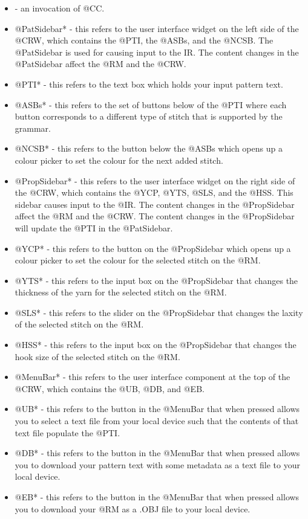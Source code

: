 \documentclass[main.tex]{subfiles}
\begin{document}
\begin{itemize}
\item {} - an invocation of @CC.
\item @PatSidebar* - this refers to the user interface widget on the left side of the @CRW, which contains the @PTI, the @ASBs, and the @NCSB. The @PatSidebar is used for causing input to the IR. The content changes in the @PatSidebar affect the @RM and the @CRW.
\item @PTI* - this refers to the text box which holds your input pattern text.
\item @ASBs* - this refers to the set of buttons below of the @PTI where each button corresponds to a different type of stitch that is supported by the grammar.
\item @NCSB* - this refers to the button below the @ASBs which opens up a colour picker to set the colour for the next added stitch.
\item @PropSidebar* - this refers to the user interface widget on the right side of the @CRW, which contains the @YCP, @YTS, @SLS, and the @HSS. This sidebar causes input to the @IR. The content changes in the @PropSidebar affect the @RM and the @CRW. The content changes in the @PropSidebar will update the @PTI in the @PatSidebar.
\item @YCP* - this refers to the button on the @PropSidebar which opens up a colour picker to set the colour for the selected stitch on the @RM.
\item @YTS* - this refers to the input box on the @PropSidebar that changes the thickness of the yarn for the selected stitch on the @RM.
\item @SLS* - this refers to the slider on the @PropSidebar that changes the laxity of the selected stitch on the @RM.
\item @HSS* - this refers to the input box on the @PropSidebar that changes the hook size of the selected stitch on the @RM.
\item @MenuBar* - this refers to the user interface component at the top of the @CRW, which contains the @UB, @DB, and @EB.
\item @UB* - this refers to the button in the @MenuBar that when pressed allows you to select a text file from your local device such that the contents of that text file populate the @PTI.
\item @DB* - this refers to the button in the @MenuBar that when pressed allows you to download your pattern text with some metadata as a text file to your local device.
\item @EB* - this refers to the button in the @MenuBar that when pressed allows you to download your @RM as a .OBJ file to your local device.

\end{itemize}
\end{document}
